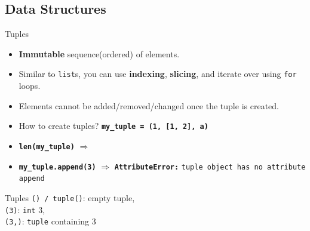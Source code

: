     \subsection{Data Structures}
    \begin{frame}{Tuples}
        \LARGE
        \begin{itemize}
            \item \textbf{Immutable} sequence(ordered) of elements.
            \pause
            \item Similar to \texttt{list}s, you can use \textbf{indexing}, \textbf{slicing}, and iterate over using \texttt{for} loops.
            \pause
            \item Elements cannot be added/removed/changed once the tuple is created.
            \pause
            \item How to create tuples?
            \pause
             \textbf{\texttt{my\_tuple = (1, [1, 2], \textquotesingle a\textquotesingle )}}
            \pause
            \item \textbf{\texttt{len(my\_tuple)}} $\Rightarrow$
            \item \textbf{\texttt{my\_tuple.append(3)}} $\Rightarrow$
            \pause
             \textbf{\texttt{AttributeError:}} \texttt{\textquotesingle tuple\textquotesingle \ object has no attribute \textquotesingle append\textquotesingle}
        \end{itemize}
    \end{frame}

    \begin{frame}{Tuples}
        \Large
        \texttt{() / tuple()}: empty tuple, \\
        \pause
         \texttt{(3)}:
        \pause
         \texttt{int} 3,\\
        \pause
         \texttt{(3,)}:
        \pause
         \texttt{tuple} containing 3\\
        \pause
        \inputminted[frame=single,framesep=2pt]{python3}{../Lecture6/code-examples/tuples.py}
    \end{frame}

